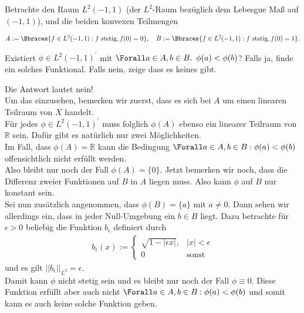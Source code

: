 \begin{exercise}

Betrachte den Raum $L^2(-1, 1)$ (der $L^2$-Raum bezüglich dem Lebesgue Maß auf $(-1, 1)$), und die beiden konvexen Teilmengen

\begin{align*}
  A := \Bbraces{f \in L^2(-1, 1): f \text{ stetig}, f(0) = 0},
  \quad
  B := \Bbraces{f \in L^2(-1, 1): f \text{ stetig}, f(0) = 1}.
\end{align*}

Existiert $\phi \in L^2(-1, 1)^\prime$ mit $\Forall a \in A, b \in B. \enspace \phi(a) < \phi(b)$?
Falls ja, finde ein solches Funktional.
Falls nein, zeige dass es keines gibt.

\end{exercise}

\begin{solution}

Die Antwort lautet nein! \\
Um das einzusehen, bemerken wir zuerst, dass es sich bei $A$ um einen linearen
Teilraum von $X$ handelt. \\
Für jedes $\phi \in L^2(-1, 1)^\prime$ muss folglich
$\phi(A)$ ebenso ein linearer Teilraum von $\mathbb{R}$ sein.
Dafür gibt es natürlich nur zwei Möglichkeiten. \\
Im Fall, dass $\phi(A) = \mathbb{R}$ kann die Bedingung $\Forall a \in A, b \in B: \phi(a) < \phi(b)$
offensichtlich nicht erfüllt werden. \\
Also bleibt nur noch der Fall $\phi(A) = \{0\}$.
Jetzt bemerken wir noch, dass die Differenz zweier Funktionen auf $B$ in $A$ liegen
muss. Also kann $\phi$ auf $B$ nur konstant sein. \\
Sei nun zusätzlich angenommen, dass $\phi(B) = \{a\}$ mit $a \neq 0$.
Dann sehen wir allerdings ein, dass in jeder Null-Umgebung ein $b \in B$ liegt.
Dazu betrachte für $\epsilon > 0$ beliebig die Funktion $b_{\epsilon}$ definiert durch
\begin{align*}
  b_{\epsilon}(x) := \begin{cases}
    \sqrt{1 - |\epsilon x|}, & |x| < \epsilon \\
    0 & \text{sonst}
  \end{cases}
\end{align*}
und es gilt $||b_{\epsilon}||_{L^2} = \epsilon$. \\
Damit kann $\phi$ nicht stetig sein und es bleibt nur noch der Fall $\phi \equiv 0$.
Diese Funktion erfüllt aber auch nicht $\Forall a \in A, b \in B: \phi(a) < \phi(b)$
und somit kann es auch keine solche Funktion geben.
\end{solution}
